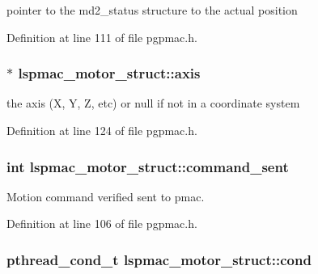 pointer to the md2\-\_\-status structure to the actual position 



Definition at line 111 of file pgpmac.\-h.

\hypertarget{structlspmac__motor__struct_a7437ef16c2dce65bde4dda1ea00e9df3}{
\subsubsection[{axis}]{$\ast$ lspmac\-\_\-motor\-\_\-struct\-::axis}}\label{structlspmac__motor__struct_a7437ef16c2dce65bde4dda1ea00e9df3}


the axis (X, Y, Z, etc) or null if not in a coordinate system 



Definition at line 124 of file pgpmac.\-h.

\hypertarget{structlspmac__motor__struct_a59a7f007476b2428fd3c5bd7f24440e8}{
\subsubsection[{command\-\_\-sent}]{\setlength{\rightskip}{0pt plus 5cm}int lspmac\-\_\-motor\-\_\-struct\-::command\-\_\-sent}}\label{structlspmac__motor__struct_a59a7f007476b2428fd3c5bd7f24440e8}


Motion command verified sent to pmac. 



Definition at line 106 of file pgpmac.\-h.

\hypertarget{structlspmac__motor__struct_aa0ea4108b8fed5b41ff91ca7266f3d84}{
\subsubsection[{cond}]{\setlength{\rightskip}{0pt plus 5cm}pthread\-\_\-cond\-\_\-t lspmac\-\_\-motor\-\_\-struct\-::cond}}\label{structlspmac__motor__struct_aa0ea4108b8fed5b41ff91ca7266f3d84}


